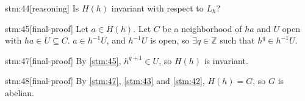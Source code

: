 \documentclass{article}
\begin{document}
\begin{stm}{stm:44}[reasoning]
Is $H(h)$ invariant with respect to $L_h$?
\end{stm}

\begin{stm}{stm:45}[final-proof]
Let $a \in H(h)$. Let $C$ be a neighborhood of $ha$ and $U$ open with $ha \in U \subseteq C$. $a \in h^{-1}U$, and $h^{-1}U$ is open, so $\exists q \in \mathbb{Z}$ such that $h^q \in h^{-1}U$.
\end{stm}

\begin{stm}{stm:47}[final-proof]
By \ref{stm:45}, $h^{q+1} \in U$, so $H(h)$ is invariant.
\end{stm}

\begin{stm}{stm:48}[final-proof]
By \ref{stm:47}, \ref{stm:43} and \ref{stm:42}, $H(h) = G$, so $G$ is abelian.
\end{stm}
\end{document}
